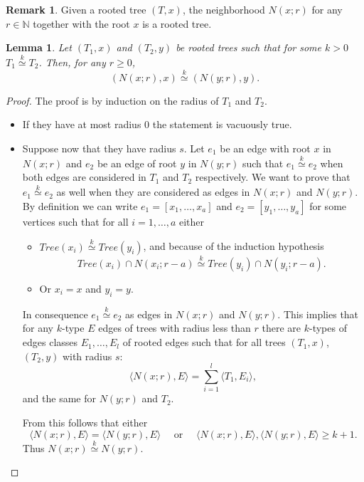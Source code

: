 \documentclass[11pt,notitlepage,a4paper]{article}
\newtheorem{lemma}{Lemma}[section]
\theoremstyle{definition}
\newtheorem{remark}{Remark}[section]
\newcommand{\N}{\mathbb{N}}
\newcommand{\morph}[1]{\stackrel{#1}{\simeq}}
\begin{document}
\begin{remark}
	Given a rooted tree $(T,x)$, the neighborhood $N(x;r)$ for any $r\in \N$
	together with the root $x$ is a rooted tree.
\end{remark}


\begin{lemma}\label{lem:radiustree}
	Let $(T_1,x)$ and $(T_2,y)$ be rooted trees such that for some $k>0$ 
	$T_1 \morph{k} T_2$. Then, for any $r\geq 0$, 
	\[(N(x;r),x)\morph{k} (N(y;r),y).\]
\end{lemma}
\begin{proof}
	The proof is by induction on the radius of $T_1$ and $T_2$.
	\begin{itemize}[leftmargin=*]
		\item If they have at most radius $0$ the statement is vacuously true. 
		\item Suppose now that they have radius $s$. Let $e_1$ be an edge with root
		$x$ in $N(x;r)$ and $e_2$ be an edge of root $y$ in $N(y;r)$ such that $e_1 \morph{k} e_2$
		when both edges are considered in $T_1$ and $T_2$ respectively. We want to prove that
		$e_1 \morph{k} e_2$ as well when they are considered as edges in $N(x;r)$ and $N(y;r)$.
		By definition we can write $e_1=[x_1,\dots,x_a]$ and 
		$e_2=[y_1,\dots,y_a]$ for some vertices such that for all
		$i=1,\dots, a$ either 
		\begin{itemize}
			\item $Tree(x_i)\morph{k} Tree(y_i)$, and because of the induction hypothesis 
			\[Tree(x_i)\cap N(x_i;r-a) \morph{k} Tree(y_i)\cap N(y_i;r-a).\] 
			\item Or $x_i=x$ and $y_i=y$.
		\end{itemize}
		In consequence $e_1 \morph{k} e_2$ as edges in $N(x;r)$ and $N(y;r)$. 
		This implies that for any $k$-type $E$ edges of trees with
		radius less than $r$ there are $k$-types of edges classes 
		$E_1,\dots,E_l$ of rooted edges such that for all trees $(T_1,x)$,$(T_2,y)$ 
		with radius $s$:
		\[ \langle N(x;r),E \rangle =  \sum_{i=1}^{l}\langle T_1, E_i\rangle ,\]
		and the same for $N(y;r)$ and $T_2$.\par
		From this follows that either
		\[ \langle N(x;r),E \rangle =\langle N(y;r),E \rangle \quad
		\text{ or } \quad  
		\langle N(x;r),E \rangle,
		\langle N(y;r),E \rangle \geq k+1. \]
		Thus $N(x;r)\morph{k} N(y;r)$.
	\end{itemize}	
\end{proof}
\end{document}
